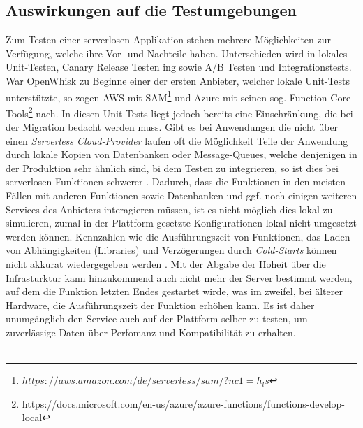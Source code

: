 \documentclass[11pt]{article}
\begin{document}

\subsection{Auswirkungen auf die Testumgebungen}
Zum Testen einer serverlosen Applikation stehen mehrere Möglichkeiten zur Verfügung, welche ihre Vor- und Nachteile haben. Unterschieden wird in lokales Unit-Testen, Canary Release Testen ing sowie A/B Testen und Integrationstests. War OpenWhisk zu Beginne einer der ersten Anbieter, welcher lokale Unit-Tests unterstützte, so zogen AWS mit SAM\footnote{$https://aws.amazon.com/de/serverless/sam/?nc1=h_ls$} und Azure mit seinen sog. Function Core Tools\footnote{https://docs.microsoft.com/en-us/azure/azure-functions/functions-develop-local} nach. In diesen Unit-Tests liegt jedoch bereits eine Einschränkung, die bei der Migration bedacht werden muss. Gibt es bei Anwendungen die nicht über einen \textit{Serverless Cloud-Provider} laufen oft die Möglichkeit Teile der Anwendung durch lokale Kopien von Datenbanken oder Message-Queues, welche denjenigen in der Produktion sehr ähnlich sind, bi dem Testen zu integrieren, so ist dies bei serverlosen Funktionen schwerer \cite{roberts2017serverless}.  Dadurch, dass die Funktionen in den meisten Fällen mit anderen Funktionen sowie Datenbanken und ggf. noch einigen weiteren Services des Anbieters interagieren müssen, ist es nicht möglich dies lokal zu simulieren, zumal in der Plattform gesetzte Konfigurationen lokal nicht umgesetzt werden können. Kennzahlen wie die Ausführungszeit von Funktionen, das Laden von Abhängigkeiten (Libraries) und Verzögerungen durch \textit{Cold-Starts} können nicht akkurat wiedergegeben werden \cite{racicot2019quality}. Mit der Abgabe der Hoheit über die Infrasturktur kann hinzukommend auch nicht mehr der Server bestimmt werden, auf dem die Funktion letzten Endes gestartet wirde, was im zweifel, bei älterer Hardware, die Ausführungszeit der Funktion erhöhen kann. Es ist daher unumgänglich den Service auch auf der Plattform selber zu testen, um zuverlässige Daten über Perfomanz und Kompatibilität zu erhalten. \\\\
\end{document}
